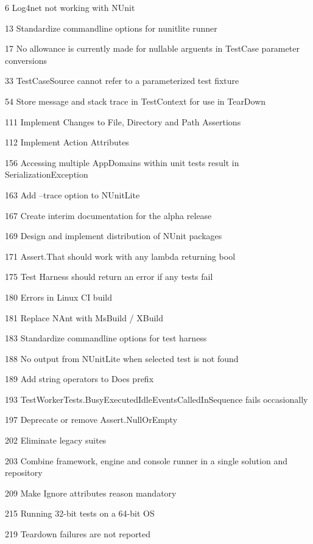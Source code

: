 \begin{DoxyItemize}
\item 6 Log4net not working with N\+Unit
\item 13 Standardize commandline options for nunitlite runner
\item 17 No allowance is currently made for nullable arguents in Test\+Case parameter conversions
\item 33 Test\+Case\+Source cannot refer to a parameterized test fixture
\item 54 Store message and stack trace in Test\+Context for use in Tear\+Down
\item 111 Implement Changes to File, Directory and Path Assertions
\item 112 Implement Action Attributes
\item 156 Accessing multiple App\+Domains within unit tests result in Serialization\+Exception
\item 163 Add --trace option to N\+Unit\+Lite
\item 167 Create interim documentation for the alpha release
\item 169 Design and implement distribution of N\+Unit packages
\item 171 Assert.\+That should work with any lambda returning bool
\item 175 Test Harness should return an error if any tests fail
\item 180 Errors in Linux CI build
\item 181 Replace N\+Ant with Ms\+Build / X\+Build
\item 183 Standardize commandline options for test harness
\item 188 No output from N\+Unit\+Lite when selected test is not found
\item 189 Add string operators to Does prefix
\item 193 Test\+Worker\+Tests.\+Busy\+Executed\+Idle\+Events\+Called\+In\+Sequence fails occasionally
\item 197 Deprecate or remove Assert.\+Null\+Or\+Empty
\item 202 Eliminate legacy suites
\item 203 Combine framework, engine and console runner in a single solution and repository
\item 209 Make Ignore attribute\textquotesingle{}s reason mandatory
\item 215 Running 32-\/bit tests on a 64-\/bit OS
\item 219 Teardown failures are not reported
\end{DoxyItemize}


